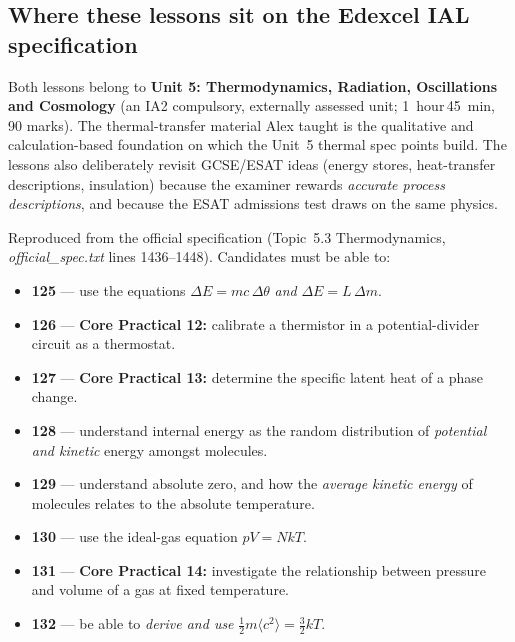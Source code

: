 \documentclass[11pt,a4paper]{article}
\newcommand{\dtheta}{\Delta\theta}
\newcommand{\dE}{\Delta E}
\begin{document}
\subsection{Where these lessons sit on the Edexcel IAL specification}

Both lessons belong to \textbf{Unit 5: Thermodynamics, Radiation, Oscillations and
Cosmology} (an IA2 compulsory, externally assessed unit; \SI{1}{hour}\,\SI{45}{min},
90 marks). The thermal-transfer material Alex taught is the qualitative and
calculation-based foundation on which the Unit~5 thermal spec points build. The lessons
also deliberately revisit GCSE/ESAT ideas (energy stores, heat-transfer descriptions,
insulation) because the examiner rewards \emph{accurate process descriptions}, and
because the ESAT admissions test draws on the same physics.

\begin{keybox}
Reproduced from the official specification (Topic~5.3 Thermodynamics,
\textit{official\_spec.txt} lines 1436--1448). Candidates must be able to:
\begin{itemize}[leftmargin=1.7em,itemsep=1pt]
  \item \textbf{125} --- use the equations $\dE = mc\,\dtheta$ \emph{and} $\dE = L\,\Delta m$.
  \item \textbf{126} --- \textbf{Core Practical 12:} calibrate a thermistor in a
        potential-divider circuit as a thermostat.
  \item \textbf{127} --- \textbf{Core Practical 13:} determine the specific latent heat of
        a phase change.
  \item \textbf{128} --- understand internal energy as the random distribution of
        \emph{potential and kinetic} energy amongst molecules.
  \item \textbf{129} --- understand absolute zero, and how the \emph{average kinetic
        energy} of molecules relates to the absolute temperature.
  \item \textbf{130} --- use the ideal-gas equation $pV = NkT$.
  \item \textbf{131} --- \textbf{Core Practical 14:} investigate the relationship between
        pressure and volume of a gas at fixed temperature.
  \item \textbf{132} --- be able to \emph{derive and use} $\tfrac{1}{2}m\langle c^2\rangle
        = \tfrac{3}{2}kT$.
\end{itemize}
\end{keybox}
\end{document}
